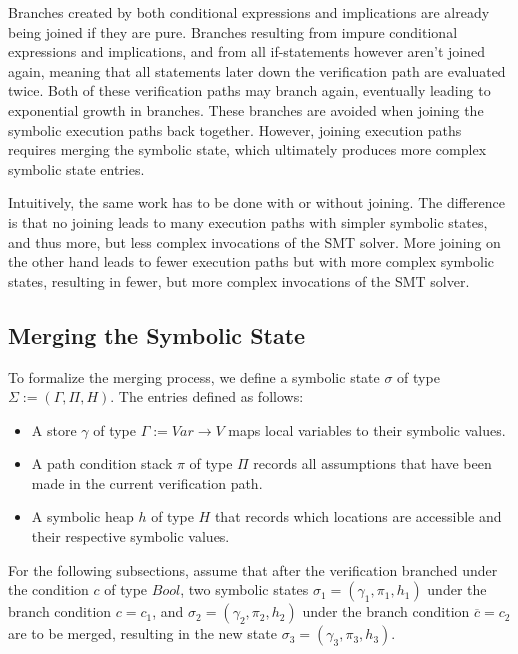 \documentclass[11pt]{article}
\begin{document}
    Branches created by both conditional expressions and implications are already being joined if they are pure.
    Branches resulting from impure conditional expressions and implications,
    and from all if-statements however aren't joined again, meaning that
    all statements later down the verification path are evaluated twice. Both of these
    verification paths may branch again, eventually leading to exponential growth in branches.
    These branches are avoided when joining the symbolic execution paths back together.
    However, joining execution paths requires merging the symbolic state, which
    ultimately produces more complex symbolic state entries.

    Intuitively, the same work has to be done with or without joining. The difference is that
    no joining leads
    to many execution paths with simpler symbolic states, and thus more, but less complex
    invocations of the SMT solver. More joining on the other hand leads to
    fewer execution paths but with more complex symbolic states, resulting in fewer,
    but more complex invocations of the SMT solver.


    \subsection{Merging the Symbolic State} \label{merging-the-symbolic-state}
    
    To formalize the merging process, we define
    a symbolic state $\sigma$ of type $\Sigma := (\Gamma, \Pi, H)$. The entries
    defined as follows:

    \begin{itemize}
        \item A store $\gamma$ of type $\Gamma := Var \to V$ maps local variables to their symbolic values.
        \item A path condition stack $\pi$ of type $\Pi$ records all assumptions that have been made in the current verification path.
        \item A symbolic heap $h$ of type $H$ that records which locations are accessible and their respective symbolic values.
    \end{itemize}

    For the following subsections, assume that after the verification branched under the condition $c$ of type $Bool$,
    two symbolic states $\sigma_1 = (\gamma_1, \pi_1, h_1)$ under the branch condition $c = c_1$, and
    $\sigma_2 = (\gamma_2, \pi_2, h_2)$ under the branch condition $\overline{c} = c_2$ are to be merged,
    resulting in the new state $\sigma_3 = (\gamma_3, \pi_3, h_3)$.
\end{document}
